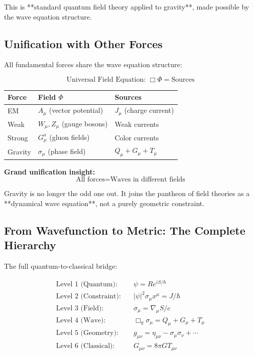 \documentclass[11pt,a4paper]{article}
\theoremstyle{definition}
\theoremstyle{remark}
\begin{document}
		This is **standard quantum field theory applied to gravity**, made possible by the wave equation structure.
		
		\subsection{Unification with Other Forces}
		
		All fundamental forces share the wave equation structure:
		
		\begin{equation}
			\boxed{\text{Universal Field Equation: } \Box \Phi = \text{Sources}}
		\end{equation}
		
		\begin{center}
			\begin{tabular}{lll}
				\hline
				\textbf{Force} & \textbf{Field $\Phi$} & \textbf{Sources}\\
				\hline
				EM & $A_\mu$ (vector potential) & $J_\mu$ (charge current)\\
				Weak & $W_\mu, Z_\mu$ (gauge bosons) & Weak currents\\
				Strong & $G_\mu^a$ (gluon fields) & Color currents\\
				Gravity & ${\sigma_\mu}$ (phase field) & ${Q_\mu + G_\mu + T_\mu}$\\
				\hline
			\end{tabular}
		\end{center}
		
		\textbf{Grand unification insight:}
		\begin{equation}
			\text{All forces} = \text{Waves in different fields}
		\end{equation}
		
		Gravity is no longer the odd one out. It joins the pantheon of field theories as a **dynamical wave equation**, not a purely geometric constraint.
		
		\subsection{From Wavefunction to Metric: The Complete Hierarchy}
		
		The full quantum-to-classical bridge:
		
		\begin{equation}
			\boxed{
				\begin{aligned}
					\text{Level 1 (Quantum):} &\quad \psi = Re^{iS/\hbar}\\
					\text{Level 2 (Constraint):} &\quad |\psi|^2\sigma_\mu x^\mu = J/\hbar\\
					\text{Level 3 (Field):} &\quad \sigma_\mu = \nabla_\mu S/c\\
					\text{Level 4 (Wave):} &\quad \Box_g\sigma_\mu = Q_\mu + G_\mu + T_\mu\\
					\text{Level 5 (Geometry):} &\quad g_{\mu\nu} = \eta_{\mu\nu} - \sigma_\mu\sigma_\nu + \cdots\\
					\text{Level 6 (Classical):} &\quad G_{\mu\nu} = 8\pi G T_{\mu\nu}
				\end{aligned}
			}
		\end{equation}
		
\end{document}

